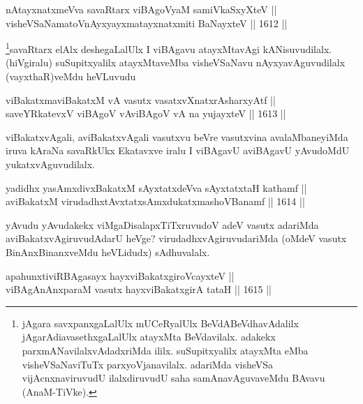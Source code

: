 
\begin{shl}
nAtayxnatxmeVva savaRtarx viBAgoV\s yaM samiVkaSxyXteV || \\
visheVSaNamatoV\s nAyxyayxmatayxnatxmiti BaNayxteV \hfill || 1612 ||  
\end{shl}

\begin{artha}
\footnote{jAgara savxpanxgaLalUlx mUCeRyalUlx BeVdABeVdhavAdalilx jAgarAdiavasethxgaLalUlx atayxMta BeVdavilalx. adakekx parxmANavilalxvAdadxriMda ililx. suSupitxyalilx atayxMta eMba visheVSaNaviTuTx parxyoVjanavilalx. adariMda visheVSa vijAcnxnaviruvudU ilalxdiruvudU saha samAnavAguvaveMdu BAvavu (AnaM-TiVke).}savaRtarx elAlx deshegaLalUlx I viBAgavu atayxMtavAgi kANisuvudilalx. (hiVgiralu) suSupitxyalilx atayxMtaveMba visheVSaNavu nAyxyavAguvudilalx (vayxthaR)veMdu heVLuvudu
\end{artha}


\begin{shl}
viBakatxmaviBakatxM vA vasutx vasatxvXnatxrAsharxyAtf ||  \\
saveYRkatevxV viBAgoV vA\s viBAgoV vA na yujayxteV \hfill || 1613 ||  
\end{shl}

\begin{artha}
viBakatxvAgali, aviBakatxvAgali vasutxvu beVre vasutxvina avalaMbaneyiMda iruva kAraNa savaRkUkx Ekatavxve iralu I viBAgavU aviBAgavU yAvudoMdU yukatxvAguvudilalx.
\end{artha}

\begin{shl}
yadidhx yasAmxdivxBakatxM sAyxtatxdeVva sAyxtatxtaH kathamf || \\
aviBakatxM virudadhxtAvxtatxsAmxdukatxmashoVBanamf \hfill || 1614 ||  
\end{shl}

\begin{artha}
yAvudu yAvudakekx viMgaDisalapxTiTxruvudoV adeV vasutx adariMda aviBakatxvAgiruvudAdarU heVge? virudadhxvAgiruvudariMda (oMdeV vasutx BinAnxBinanxveMdu heVLidudx) sAdhuvalalx.
\end{artha}

\begin{shl}
apahunxtiviRBAgasayx hayxviBakatxgiroVcayxteV ||  \\
viBAgAnAnxparaM vasutx hayxviBakatxgirA tataH \hfill || 1615 ||  
\end{shl}

